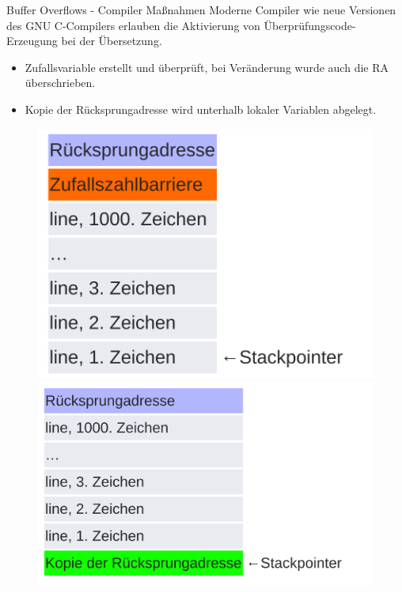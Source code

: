 \documentclass[10pt]{beamer}
\begin{document}
\begin{frame}[fragile]{Buffer Overflows - Compiler Ma{\ss}nahmen}
  Moderne Compiler wie neue Versionen des GNU C-Compilers erlauben die Aktivierung von \"Uberprüfungscode-Erzeugung bei der \"Ubersetzung.

  \begin{itemize}
    \item Zufallsvariable erstellt und \"uberpr\"uft, bei Ver\"anderung wurde auch die RA \"uberschrieben.
    \item Kopie der R\"ucksprungadresse wird unterhalb lokaler Variablen abgelegt.
  \end{itemize}

  \begin{figure}%
   \centering
   {\includegraphics[scale=0.10]{stackgcc_1}}%
   \quad
   {\includegraphics[scale=0.10]{stackgcc_2}}%
  \end{figure}
\end{frame}
\end{document}
